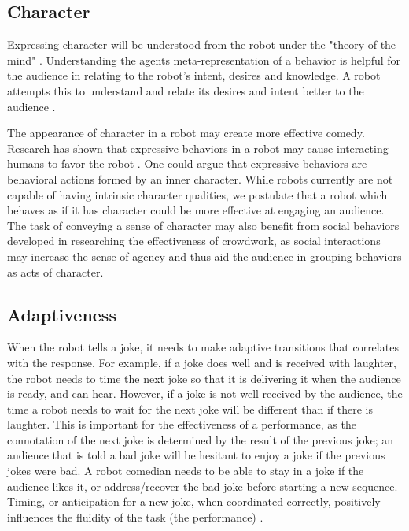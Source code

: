\documentclass[onecolumn, draftclsnofoot,10pt, compsoc]{IEEEtran}
\begin{document}
\subsection{Character}
Expressing character will be understood from the robot under the "theory of the mind" \cite{leslie}. Understanding the agents meta-representation of a behavior is helpful for the audience in relating to the robot's intent, desires and knowledge. A robot attempts this to understand and relate its desires and intent better to the audience \cite{theoryOfMindRobots}.


The appearance of character in a robot may create more effective comedy.
Research has shown that expressive behaviors in a robot may cause interacting humans to favor the robot \cite{DesignExBeh:2017}.
One could argue that expressive behaviors are behavioral actions formed by an inner character. While robots currently are not capable of having intrinsic character qualities, we postulate that a robot which behaves as if it has character could be more effective at engaging an audience. The task of conveying a sense of character may also benefit from social behaviors developed in researching the effectiveness of crowdwork, as social interactions may increase the sense of agency \cite{KnightEightLessons:2011} and thus aid the audience in grouping behaviors as acts of character.




\subsection{Adaptiveness}




When the robot tells a joke, it needs to make adaptive transitions that correlates with the response. For example, if a joke does well and is received with laughter, the robot needs to time the next joke so that it is delivering it when the audience is ready, and can hear. However, if a joke is not well received by the audience, the time a robot needs to wait for the next joke will be different than if there is laughter. This is important for the effectiveness of a performance, as the connotation of the next joke is determined by the result of the previous joke; an audience that is told a bad joke will be hesitant to enjoy a joke if the previous jokes were bad. A robot comedian needs to be able to stay in a joke if the audience likes it, or address/recover the bad joke before starting a new sequence. Timing, or anticipation for a new joke, when coordinated correctly, positively influences the fluidity of the task (the performance) \cite{hoffman2010anticipation}.
\end{document}
